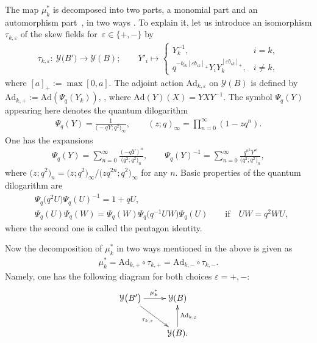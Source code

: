\documentclass[11pt]{article}
\numberwithin{equation}{section}
\def\ve{{\varepsilon}}
\numberwithin{equation}{section}
\begin{document}
The map $\mu_k^{\ast}$ is decomposed into two parts, a monomial part
and an automorphism part~\cite{FG09}, in two ways \cite{Ke11}. To explain it,
let us introduce an isomorphism $\tau_{k,\varepsilon}$ of the
skew fields for~${\varepsilon \in \{+,-\}}$ by
\begin{align}\label{tauy}
\tau_{k,\ve} \colon\ \mathcal{Y}\bigl(B'\bigr) \to \mathcal{Y}(B)
; \qquad Y'_i \mapsto
\begin{cases}
 Y_k^{-1}, & i= k,
 \\
 q^{-b_{ik}[\ve b_{ik}]_+}Y_i Y_k^{[\ve b_{ik}]_+}, & i \neq k,
\end{cases}
\end{align}
where $[a]_+ := \max[0,a]$.
The adjoint action $\mathrm{Ad}_{k,\ve}$ on $\mathcal{Y}(B)$ is defined by
$\mathrm{Ad}_{k,+} := \mathrm{Ad}(\Psi_{q}(Y_k)) $, ,
where $\mathrm{Ad}(Y)(X) = YXY^{-1}$.
The symbol $\Psi_q(Y)$ appearing here denotes the quantum dilogarithm
\begin{align}\label{Psiq}
\Psi_q(Y) = \frac{1}{\bigl(-qY; q^2\bigr)_\infty}, \qquad (z;q)_\infty = \prod_{n=0}^\infty (1-zq^n).
\end{align}
One has the expansions
\begin{align}\label{expa}
\Psi_q(Y) = \sum_{n = 0}^\infty \frac{(-qY)^n}{\bigl(q^2;q^2\bigr)_n},
\qquad
\Psi_q(Y)^{-1} = \sum_{n = 0}^\infty \frac{q^{n^2} Y^n}{\bigl(q^2;q^2\bigr)_n},
\end{align}
where $\bigl(z;q^2\bigr)_n = \bigl(z;q^2\bigr)_\infty/\bigl(zq^{2n};q^2\bigr)_\infty$ for any $n$.
Basic properties of the quantum dilogarithm are{\samepage
\begin{align}%
\label{Prec}
&\Psi_q\bigl(q^2 U\bigr) \Psi_q(U)^{-1} = 1+qU,
\\
&\Psi_q(U)\Psi_q(W) = \Psi_q(W) \Psi_q\bigl(q^{-1}UW\bigr) \Psi_q(U) \qquad \text{if}\quad UW = q^2WU,\nonumber
\end{align}
where the second one is called the pentagon identity.}

Now the decomposition of $\mu^\ast_k$ in two ways mentioned in the above
is given as
\begin{align}\label{mud}
\mu_k^{\ast} = \mathrm{Ad}_{k,+} \circ \tau_{k,+}
= \mathrm{Ad}_{k,-} \circ \tau_{k,-}.
\end{align}
Namely, one has the following diagram for both choices $\ve=+, -$:
\begin{align*}
\xymatrix{
\mathcal{Y}\bigl(B'\bigr) \ar[r]^{\mu_k^\ast} \ar[dr]_{\tau_{k,\ve}} & \mathcal{Y}(B)
\\
& \mathcal{Y}(B) \ar[u]_{\mathrm{Ad}_{k,\ve}}.
}
\end{align*}
\end{document}
